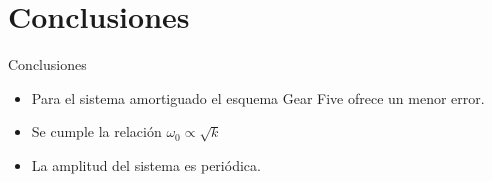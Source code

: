 \section{Conclusiones}\label{sec:conclusiones}

\begin{frame}{Conclusiones}
    \Large{
    \begin{itemize}
        \item Para el sistema amortiguado el esquema Gear Five ofrece un menor error.
        \item Se cumple la relación $\omega_0 \propto \sqrt{k}$
        \item La amplitud del sistema es periódica.
    \end{itemize}
    }
\end{frame}